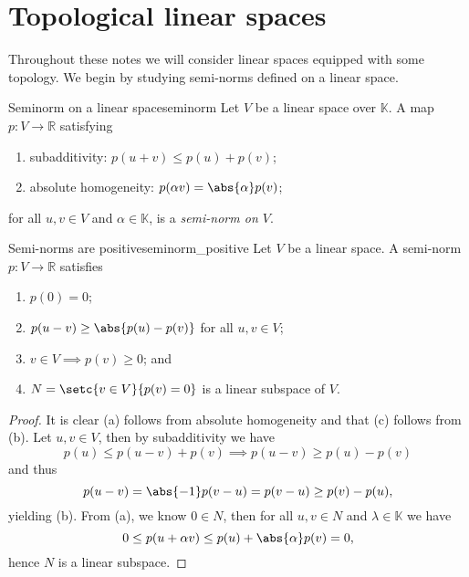 \section{Topological linear spaces}
Throughout these notes we will consider linear spaces equipped with some topology. We begin by studying semi-norms defined on a linear space.

\begin{definition}{Seminorm on a linear space}{seminorm}
    Let \(V\) be a linear space over \(\mathbb{K}\). A map \(p : V \to \mathbb{R}\) satisfying
    \begin{enumerate}[label=(\alph*)]
        \item subadditivity: \(p(u + v) \leq p(u) + p(v)\);
        \item absolute homogeneity: \(p(\alpha v) = \abs{\alpha} p(v)\);
    \end{enumerate}
    for all \(u,v \in V\) and \(\alpha \in \mathbb{K}\), is a \emph{semi-norm on \(V\)}.
\end{definition}

\begin{proposition}{Semi-norms are positive}{seminorm_positive}
    Let \(V\) be a linear space. A semi-norm \(p : V \to \mathbb{R}\) satisfies 
    \begin{enumerate}[label=(\alph*)]
        \item \(p(0) = 0\);
        \item \(p(u - v) \geq \abs{p(u) - p(v)}\) for all \(u, v \in V\);
        \item \(v \in V \implies p(v) \geq 0\); and
        \item \(N = \setc{v \in V}{p(v) = 0}\) is a linear subspace of \(V\).
    \end{enumerate}
\end{proposition}
\begin{proof}
    It is clear (a) follows from absolute homogeneity and that (c) follows from (b). Let \(u, v \in V\), then by subadditivity we have
    \begin{equation*}
        p(u) \leq p(u - v) + p(v) \implies p(u - v) \geq p(u) - p(v)
    \end{equation*}
    and thus
    \begin{equation*}
        p(u - v) = \abs{-1} p(v - u) = p(v - u) \geq p(v) - p(u),
    \end{equation*}
    yielding (b). From (a), we know \(0 \in N\), then for all \(u, v \in N\) and \(\lambda \in \mathbb{K}\) we have
    \begin{equation*}
        0 \leq p(u + \alpha v) \leq p(u) + \abs{\alpha} p(v) = 0,
    \end{equation*}
    hence \(N\) is a linear subspace.
\end{proof}

